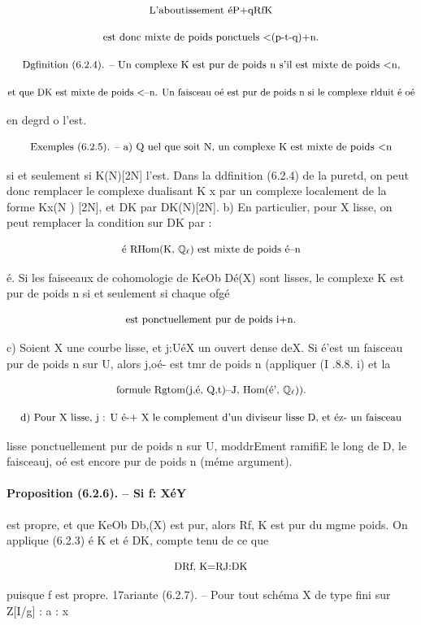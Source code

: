 \documentclass[11pt]{article}
\theoremstyle{remark}
\begin{document}
\[\text{\small L'aboutissement éP+qRfK}\]

\[\text{\small est donc mixte de poids ponctuels <(p-t-q)+n.}\]

\[\text{\small Dgfinition (6.2.4). -- Un complexe K est pur de poids n s'il est mixte de poids <n,}\]

\[\text{\small et que DK est mixte de poids <--n. Un faisceau oé est pur de poids n si le complexe rlduit é oé}\]

en degrd o l'est.

\[\text{\small Exemples (6.2.5). -- a) Q uel que soit N, un complexe K est mixte de poids <n}\]

si et seulement si K(N)[2N] l'est. Dans la ddfinition (6.2.4) de la puretd, on peut donc remplacer le complexe dualisant K x par un complexe localement de la forme Kx(N ) [2N], et DK par DK(N)[2N]. b) En particulier, pour X lisse, on peut remplacer la condition sur DK par :

\[\text{\small é RHom(K, \(\mathbb{Q}_{\ell}\)) est mixte de poids é--n}\]

é. Si les faiseeaux de cohomologie de KeOb Dé(X) sont lisses, le complexe K est pur de poids n si et seulement si chaque ofgé

\[\text{\small est ponctuellement pur de poids i+n.}\]

c) Soient X une courbe lisse, et j:UéX un ouvert dense deX. Si é'est un faisceau pur de poids n sur U, alors j,oé- est tmr de poids n (appliquer (I .8.8. i) et la

\[\text{\small formule Rgtom(j,é, Q,t)--J, Hom(é', \(\mathbb{Q}_{\ell}\))).}\]

\[\text{\small d) Pour X lisse, j : U é-+ X le complement d'un diviseur lisse D, et éz- un faisceau}\]

lisse ponctuellement pur de poids n sur U, moddrEment ramifiE le long de D, le faisceauj, oé est encore pur de poids n (méme argument).

\paragraph{Proposition (6.2.6). -- Si f: XéY}

est propre, et que KeOb Db,(X) est pur, alors Rf, K est pur du mgme poids. On applique (6.2.3) é K et é DK, compte tenu de ce que

\[\text{\small DRf, K=RJ:DK}\]

puisque f est propre. 17ariante (6.2.7). -- Pour tout schéma X de type fini sur Z[I/g] : a : x
\end{document}
